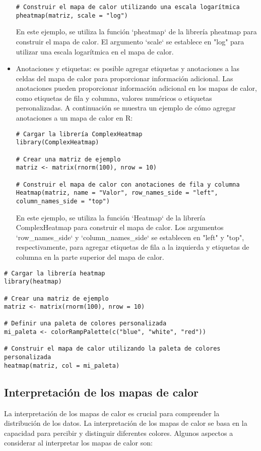\documentclass{article}
\begin{document}
\begin{itemize}
\begin{verbatim}
# Construir el mapa de calor utilizando una escala logarítmica
pheatmap(matriz, scale = "log")
\end{verbatim}

En este ejemplo, se utiliza la función `pheatmap` de la librería pheatmap para construir el mapa de calor. El argumento `scale` se establece en "log" para utilizar una escala logarítmica en el mapa de calor.

    
    \item Anotaciones y etiquetas: es posible agregar etiquetas y anotaciones a las celdas del mapa de calor para proporcionar información adicional.  Las anotaciones pueden proporcionar información adicional en los mapas de calor, como etiquetas de fila y columna, valores numéricos o etiquetas personalizadas. A continuación se muestra un ejemplo de cómo agregar anotaciones a un mapa de calor en R:

\begin{verbatim}
# Cargar la librería ComplexHeatmap
library(ComplexHeatmap)

# Crear una matriz de ejemplo
matriz <- matrix(rnorm(100), nrow = 10)

# Construir el mapa de calor con anotaciones de fila y columna
Heatmap(matriz, name = "Valor", row_names_side = "left", column_names_side = "top")
\end{verbatim}

En este ejemplo, se utiliza la función `Heatmap` de la librería ComplexHeatmap para construir el mapa de calor. Los argumentos `row\_names\_side` y `column\_names\_side` se establecen en "left" y "top", respectivamente, para agregar etiquetas de fila a la izquierda y etiquetas de columna en la parte superior del mapa de calor.
\end{itemize}


\begin{verbatim}
# Cargar la librería heatmap
library(heatmap)

# Crear una matriz de ejemplo
matriz <- matrix(rnorm(100), nrow = 10)

# Definir una paleta de colores personalizada
mi_paleta <- colorRampPalette(c("blue", "white", "red"))

# Construir el mapa de calor utilizando la paleta de colores personalizada
heatmap(matriz, col = mi_paleta)
\end{verbatim}

\subsection{Interpretación de los mapas de calor}
La interpretación de los mapas de calor es crucial para comprender la distribución de los datos.  La interpretación de los mapas de calor se basa en la capacidad para percibir y distinguir diferentes colores.  Algunos aspectos a considerar al interpretar los mapas de calor son:
\end{document}
